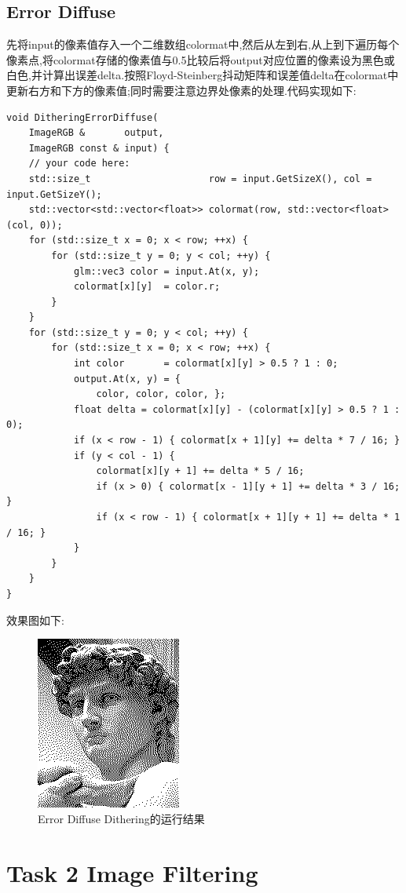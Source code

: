 \documentclass{ctexart}
\begin{document}
\subsection*{Error Diffuse}
先将{\codefont input}的像素值存入一个二维数组{\codefont colormat}中,然后从左到右,从上到下遍历每个像素点,将{\codefont colormat}存储的像素值与0.5比较后将{\codefont output}对应位置的像素设为黑色或白色,并计算出误差{\codefont delta}.按照Floyd-Steinberg抖动矩阵和误差值{\codefont delta}在{\codefont colormat}中更新右方和下方的像素值;同时需要注意边界处像素的处理.代码实现如下:
\begin{lstlisting}
void DitheringErrorDiffuse(
    ImageRGB &       output,
    ImageRGB const & input) {
    // your code here:
    std::size_t                     row = input.GetSizeX(), col = input.GetSizeY();
    std::vector<std::vector<float>> colormat(row, std::vector<float>(col, 0));
    for (std::size_t x = 0; x < row; ++x) {
        for (std::size_t y = 0; y < col; ++y) {
            glm::vec3 color = input.At(x, y);
            colormat[x][y]  = color.r;
        }
    }
    for (std::size_t y = 0; y < col; ++y) {
        for (std::size_t x = 0; x < row; ++x) {
            int color       = colormat[x][y] > 0.5 ? 1 : 0;
            output.At(x, y) = {
                color, color, color, };
            float delta = colormat[x][y] - (colormat[x][y] > 0.5 ? 1 : 0);
            if (x < row - 1) { colormat[x + 1][y] += delta * 7 / 16; }
            if (y < col - 1) {
                colormat[x][y + 1] += delta * 5 / 16;
                if (x > 0) { colormat[x - 1][y + 1] += delta * 3 / 16; }
                if (x < row - 1) { colormat[x + 1][y + 1] += delta * 1 / 16; }
            }
        }
    }
}   
\end{lstlisting}
效果图如下:
\begin{figure}[H]
    \centering\includegraphics[scale=0.75]{figure/ErrorDiffuse.png}
    \caption{Error Diffuse Dithering的运行结果}
\end{figure}
\section*{Task 2 Image Filtering}
\end{document}
